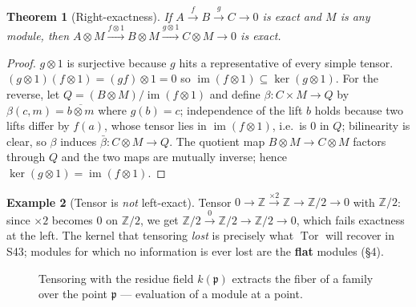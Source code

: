 \documentclass[11pt,a4paper]{article}
\newtheorem{theorem}{Theorem}[section]
\theoremstyle{definition}
\newtheorem{example}[theorem]{Example}
\newcommand{\Z}{\mathbb{Z}}
\newcommand{\R}{\mathbb{R}}
\newcommand{\im}{\operatorname{im}}
\newcommand{\Spec}{\operatorname{Spec}}
\newcommand{\Tor}{\operatorname{Tor}}
\newcommand{\p}{\mathfrak{p}}
\begin{document}
\begin{theorem}[Right-exactness]\label{thm:right-exact}
If $A\xrightarrow{f}B\xrightarrow{g}C\to0$ is exact and $M$ is any module, then
$A\otimes M\xrightarrow{f\otimes 1}B\otimes M\xrightarrow{g\otimes 1}C\otimes M\to0$ is exact.
\end{theorem}
\begin{proof}
$g\otimes1$ is surjective because $g$ hits a representative of every simple tensor.
$(g\otimes1)(f\otimes1)=(gf)\otimes1=0$ so $\im(f\otimes1)\subseteq\ker(g\otimes1)$. For the reverse,
let $Q=(B\otimes M)/\im(f\otimes1)$ and define $\beta:C\times M\to Q$ by $\beta(c,m)=\overline{b\otimes m}$
where $g(b)=c$; independence of the lift $b$ holds because two lifts differ by $f(a)$, whose tensor
lies in $\im(f\otimes1)$, i.e.\ is $0$ in $Q$; bilinearity is clear, so $\beta$ induces
$\bar\beta:C\otimes M\to Q$. The quotient map $B\otimes M\to C\otimes M$ factors through $Q$ and the
two maps are mutually inverse; hence $\ker(g\otimes1)=\im(f\otimes1)$.
\end{proof}

\begin{example}[Tensor is \emph{not} left-exact]\label{ex:not-left-exact}
Tensor $0\to\Z\xrightarrow{\times2}\Z\to\Z/2\to0$ with $\Z/2$: since $\times2$ becomes $0$ on $\Z/2$,
we get $\Z/2\xrightarrow{0}\Z/2\to\Z/2\to0$, which fails exactness at the left. The kernel that
tensoring \emph{lost} is precisely what $\Tor$ will recover in S43; modules for which no information
is ever lost are the \textbf{flat} modules (\S4).
\end{example}

\begin{figure}[h]
\centering
{}
\caption{Tensoring with the residue field $k(\p)$ extracts the fiber of a family over the point
$\p$ --- evaluation of a module at a point.}
\end{figure}

\end{document}
